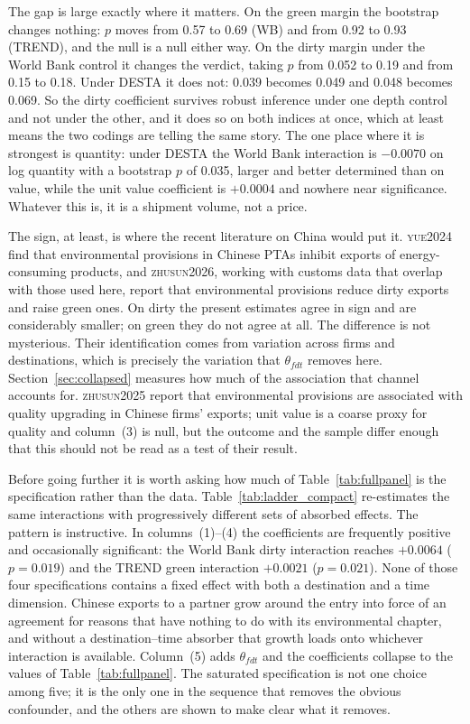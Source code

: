 \documentclass[11pt]{article}
\newcommand{\citet}[1]{\textsc{#1}}
\begin{document}
The gap is large exactly where it matters. On the green margin the bootstrap changes nothing: $p$
moves from 0.57 to 0.69 (WB) and from 0.92 to 0.93 (TREND), and the null is a null either way. On the
dirty margin under the World Bank control it changes the verdict, taking $p$ from 0.052 to 0.19 and
from 0.15 to 0.18. Under DESTA it does not: 0.039 becomes 0.049 and 0.048 becomes 0.069. So the dirty
coefficient survives robust inference under one depth control and not under the other, and it does so
on both indices at once, which at least means the two codings are telling the same story. The one
place where it is strongest is quantity: under DESTA the World Bank interaction is $-0.0070$ on log
quantity with a bootstrap $p$ of 0.035, larger and better determined than on value, while the unit
value coefficient is $+0.0004$ and nowhere near significance. Whatever this is, it is a shipment
volume, not a price.

The sign, at least, is where the recent literature on China would put it. \citet{yue2024} find that
environmental provisions in Chinese PTAs inhibit exports of energy-consuming products, and
\citet{zhusun2026}, working with customs data that overlap with those used here, report that
environmental provisions reduce dirty exports and raise green ones. On dirty the present estimates
agree in sign and are considerably smaller; on green they do not agree at all. The difference is not
mysterious. Their identification comes from variation across firms and destinations, which is
precisely the variation that $\theta_{fdt}$ removes here. Section~\ref{sec:collapsed} measures how
much of the association that channel accounts for. \citet{zhusun2025} report that environmental
provisions are associated with quality upgrading in Chinese firms' exports; unit value is a coarse
proxy for quality and column~(3) is null, but the outcome and the sample differ enough that this
should not be read as a test of their result.

Before going further it is worth asking how much of Table~\ref{tab:fullpanel} is the specification
rather than the data. Table~\ref{tab:ladder_compact} re-estimates the same interactions with
progressively different sets of absorbed effects. The pattern is instructive. In columns~(1)--(4) the
coefficients are frequently positive and occasionally significant: the World Bank dirty interaction
reaches $+0.0064$ ($p = 0.019$) and the TREND green interaction $+0.0021$ ($p = 0.021$). None of those
four specifications contains a fixed effect with both a destination and a time dimension. Chinese
exports to a partner grow around the entry into force of an agreement for reasons that have nothing to
do with its environmental chapter, and without a destination--time absorber that growth loads onto
whichever interaction is available. Column~(5) adds $\theta_{fdt}$ and the coefficients collapse to the
values of Table~\ref{tab:fullpanel}. The saturated specification is not one choice among five; it is
the only one in the sequence that removes the obvious confounder, and the others are shown to make
clear what it removes.
\end{document}
